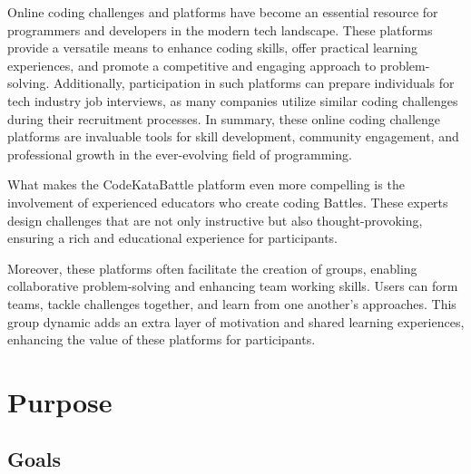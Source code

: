 Online coding challenges and platforms have become an essential resource for programmers and developers in the modern tech landscape. These platforms provide a versatile means to enhance coding skills, offer practical learning experiences, and promote a competitive and engaging approach to problem-solving. Additionally, participation in such platforms can prepare individuals for tech industry job interviews, as many companies utilize similar coding challenges during their recruitment processes. 
In summary, these online coding challenge platforms are invaluable tools for skill development, community engagement, and professional growth in the ever-evolving field of programming.

What makes the CodeKataBattle platform even more compelling is the involvement of experienced educators who create coding Battles. These experts design challenges that are not only instructive but also thought-provoking, ensuring a rich and educational experience for participants.

Moreover, these platforms often facilitate the creation of groups, enabling collaborative problem-solving and enhancing team working skills. Users can form teams, tackle challenges together, and learn from one another's approaches. This group dynamic adds an extra layer of motivation and shared learning experiences, enhancing the value of these platforms for participants.

\newpage

\section{Purpose}
\label{sec:purpose}%

\subsection{Goals}
\label{subsec:goals}%
\setcounter{g}{1}
\newcommand{\cg}{\theg\stepcounter{g}}


